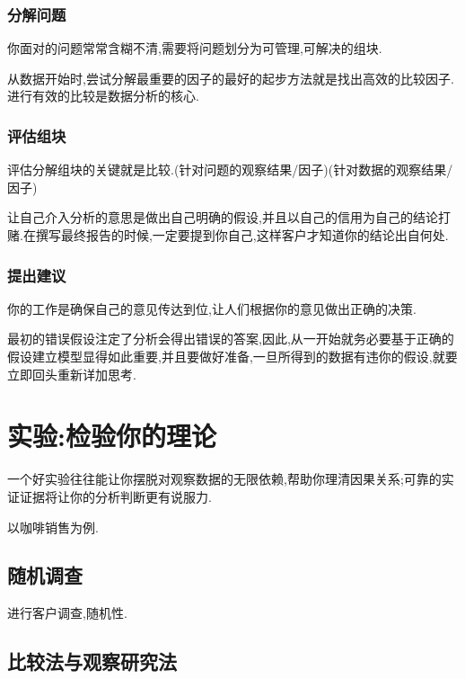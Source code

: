 \documentclass[11pt,a4paper,oneside]{book}
\begin{document}
\subsection{分解问题}
你面对的问题常常含糊不清,需要将问题划分为可管理,可解决的组块.

从数据开始时,尝试分解最重要的因子的最好的起步方法就是找出高效的比较因子.进行有效的比较是数据分析的核心.

\subsection{评估组块}
评估分解组块的关键就是比较.(针对问题的观察结果/因子)(针对数据的观察结果/因子)

让自己介入分析的意思是做出自己明确的假设,并且以自己的信用为自己的结论打赌.在撰写最终报告的时候,一定要提到你自己,这样客户才知道你的结论出自何处.

\subsection{提出建议}
你的工作是确保自己的意见传达到位,让人们根据你的意见做出正确的决策.

最初的错误假设注定了分析会得出错误的答案,因此,从一开始就务必要基于正确的假设建立模型显得如此重要,并且要做好准备,一旦所得到的数据有违你的假设,就要立即回头重新详加思考.

\chapter{实验:检验你的理论}
一个好实验往往能让你摆脱对观察数据的无限依赖,帮助你理清因果关系;可靠的实证证据将让你的分析判断更有说服力.

以咖啡销售为例.

\section{随机调查}
进行客户调查,随机性.
\section{比较法与观察研究法}
\end{document}
